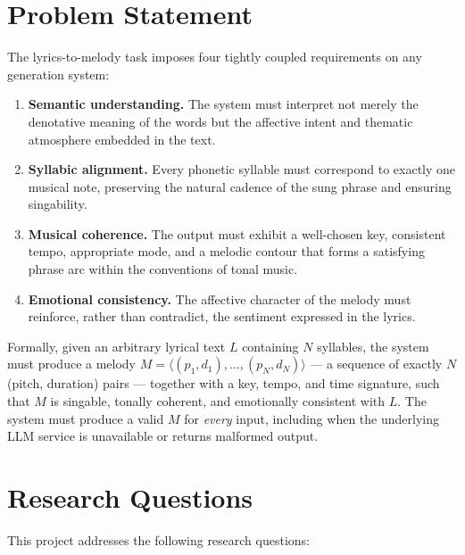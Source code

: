 \section{Problem Statement}
\label{sec:problem-statement}

The lyrics-to-melody task imposes four tightly coupled requirements on any
generation system:

\begin{enumerate}
    \item \textbf{Semantic understanding.} The system must interpret not
    merely the denotative meaning of the words but the affective intent and
    thematic atmosphere embedded in the text.
    \item \textbf{Syllabic alignment.} Every phonetic syllable must
    correspond to exactly one musical note, preserving the natural cadence
    of the sung phrase and ensuring singability.
    \item \textbf{Musical coherence.} The output must exhibit a well-chosen
    key, consistent tempo, appropriate mode, and a melodic contour that forms
    a satisfying phrase arc within the conventions of tonal music.
    \item \textbf{Emotional consistency.} The affective character of the
    melody must reinforce, rather than contradict, the sentiment expressed
    in the lyrics.
\end{enumerate}

Formally, given an arbitrary lyrical text $L$ containing $N$ syllables, the
system must produce a melody $M = \langle (p_1, d_1), \ldots, (p_N, d_N)
\rangle$ --- a sequence of exactly $N$ (pitch, duration) pairs --- together
with a key, tempo, and time signature, such that $M$ is singable, tonally
coherent, and emotionally consistent with $L$. The system must produce a
valid $M$ for \emph{every} input, including when the underlying LLM service
is unavailable or returns malformed output.

\section{Research Questions}
\label{sec:research-questions}

This project addresses the following research questions:

